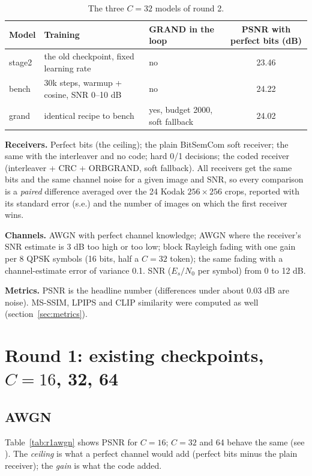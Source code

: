 \documentclass{article}
\begin{document}
\begin{table}[H]
\centering\footnotesize
\begin{tabular}{lllc}
\toprule
Model & Training & GRAND in the loop & PSNR with perfect bits (dB) \\
\midrule
stage2 & the old checkpoint, fixed learning rate & no & 23.46 \\
bench & 30k steps, warmup + cosine, SNR 0--10 dB & no & 24.22 \\
grand & identical recipe to bench & yes, budget 2000, soft fallback & 24.02 \\
\bottomrule
\end{tabular}
\caption{The three $C=32$ models of round 2.}
\end{table}

\textbf{Receivers.} Perfect bits (the ceiling); the plain BitSemCom soft receiver; the same with the
interleaver and no code; hard 0/1 decisions; the coded receiver (interleaver + CRC + ORBGRAND, soft
fallback). All receivers get the same bits and the same channel noise for a given image and SNR, so
every comparison is a \emph{paired} difference averaged over the 24 Kodak $256\times256$ crops, reported
with its standard error (s.e.) and the number of images on which the first receiver wins.

\textbf{Channels.} AWGN with perfect channel knowledge; AWGN where the receiver's SNR estimate is 3 dB
too high or too low; block Rayleigh fading with one gain per 8 QPSK symbols (16 bits, half a $C=32$ token); the same fading with a
channel-estimate error of variance 0.1. SNR ($E_s/N_0$ per symbol) from 0 to 12 dB.

\textbf{Metrics.} PSNR is the headline number (differences under about 0.03 dB are noise). MS-SSIM,
LPIPS and CLIP similarity were computed as well (section~\ref{sec:metrics}).

\section{Round 1: existing checkpoints, $C = 16$, 32, 64}

\subsection{AWGN}

Table~\ref{tab:r1awgn} shows PSNR for $C=16$; $C=32$ and 64 behave the same (see
). The \emph{ceiling} is what a perfect channel would add (perfect bits
minus the plain receiver); the \emph{gain} is what the code added.
\end{document}
